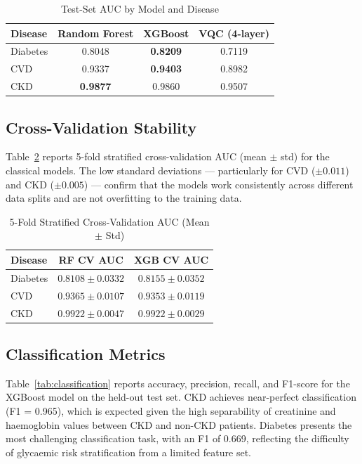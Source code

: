 ﻿\documentclass[conference]{IEEEtran}
\begin{document}
\begin{table}[htbp]
\caption{Test-Set AUC by Model and Disease}
\label{tab:auc_test}
\centering
\begin{tabular}{lccc}
\toprule
\textbf{Disease} & \textbf{Random Forest} & \textbf{XGBoost} & \textbf{VQC (4-layer)} \\
\midrule
Diabetes & 0.8048 & \textbf{0.8209} & 0.7119 \\
CVD      & 0.9337 & \textbf{0.9403} & 0.8982 \\
CKD      & \textbf{0.9877} & 0.9860 & 0.9507 \\
\bottomrule
\end{tabular}
\end{table}

\subsection{Cross-Validation Stability}

Table~\ref{tab:cv_auc} reports 5-fold stratified cross-validation AUC (mean $\pm$ std)
for the classical models. The low standard deviations --- particularly for CVD
($\pm 0.011$) and CKD ($\pm 0.005$) --- confirm that the models work consistently across
different data splits and are not overfitting to the training data.

\begin{table}[htbp]
\caption{5-Fold Stratified Cross-Validation AUC (Mean $\pm$ Std)}
\label{tab:cv_auc}
\centering
\begin{tabular}{lcc}
\toprule
\textbf{Disease} & \textbf{RF CV AUC} & \textbf{XGB CV AUC} \\
\midrule
Diabetes & $0.8108 \pm 0.0332$ & $0.8155 \pm 0.0352$ \\
CVD      & $0.9365 \pm 0.0107$ & $0.9353 \pm 0.0119$ \\
CKD      & $0.9922 \pm 0.0047$ & $0.9922 \pm 0.0029$ \\
\bottomrule
\end{tabular}
\end{table}

\subsection{Classification Metrics}

Table~\ref{tab:classification} reports accuracy, precision, recall, and F1-score for the
XGBoost model on the held-out test set. CKD achieves near-perfect classification
(F1 = 0.965), which is expected given the high separability of creatinine and haemoglobin
values between CKD and non-CKD patients. Diabetes presents the most challenging
classification task, with an F1 of 0.669, reflecting the difficulty of glycaemic risk
stratification from a limited feature set.
\end{document}
